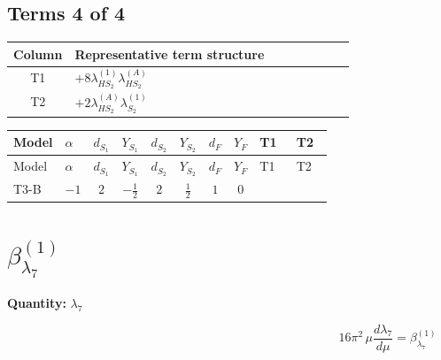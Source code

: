 \documentclass[8pt]{article}
\begin{document}
\begin{landscape}
\subsection*{Terms 4 of 4}
\begin{center}
\begin{tabular}{@{}c >{\raggedright\arraybackslash}p{0.82\linewidth}@{}}
\toprule
Column & Representative term structure \\
\midrule
T1 & \(\displaystyle +8 {\lambda_{HS_2}^{(1)}} {\lambda_{HS_2}^{(A)}}\) \\
\midrule
T2 & \(\displaystyle +2 {\lambda_{HS_2}^{(A)}} {\lambda_{S_2}^{(1)}}\) \\
\midrule
\bottomrule
\end{tabular}
\end{center}
\smallskip
\tiny
\begin{longtable}{@{}llcccccc >{\raggedright\arraybackslash}p{0.21\linewidth} >{\raggedright\arraybackslash}p{0.21\linewidth}@{}}
\toprule
Model & $\alpha$ & $d_{S_1}$ & $Y_{S_1}$ & $d_{S_2}$ & $Y_{S_2}$ & $d_F$ & $Y_F$ & T1 & T2 \\
\midrule
\endfirsthead
\toprule
Model & $\alpha$ & $d_{S_1}$ & $Y_{S_1}$ & $d_{S_2}$ & $Y_{S_2}$ & $d_F$ & $Y_F$ & T1 & T2 \\
\midrule
\endhead
T3-B & $-1$ & $2$ & $-\frac{1}{2}$ & $2$ & $\frac{1}{2}$ & $1$ & $0$ & \scriptsize\adjustbox{max width=\linewidth}{$\begin{gathered} +8 {\lambda_{HS_2}^{(1)}} {\lambda_{HS_2}^{(A)}}\end{gathered}$} & \scriptsize\adjustbox{max width=\linewidth}{$\begin{gathered} +2 {\lambda_{HS_2}^{(A)}} {\lambda_{S_2}^{(1)}}\end{gathered}$} \\
\midrule
\bottomrule
\end{longtable}
\clearpage
\section*{$\beta_{\lambda_{7}}^{(1)}$}
\noindent\textbf{Quantity: }$\lambda_{7}$\par\smallskip
\[16\pi^2\,\mu\frac{d \lambda_{7}}{d\mu}=\beta_{\lambda_{7}}^{(1)}\]

\end{landscape}
\end{document}
